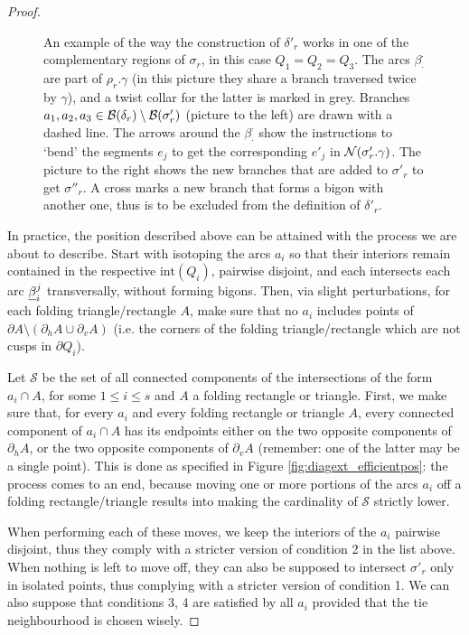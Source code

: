 \begin{proof}
\begin{figure}
\centering
\def\svgwidth{.85\textwidth}

\caption{\label{fig:diagextconstruction}An example of the way the construction of $\delta'_r$ works in one of the complementary regions of $\sigma_r$, in this case $Q_1=Q_2=Q_3$. The arcs $\beta_\cdot^\cdot$ are part of $\rho_r.\gamma$ (in this picture they share a branch traversed twice by $\gamma$), and a twist collar for the latter is marked in grey. Branches $a_1,a_2,a_3\in\mathcal B(\delta_r)\setminus\mathcal B(\sigma'_r)$ (picture to the left) are drawn with a dashed line. The arrows around the $\beta_\cdot^\cdot$ show the instructions to `bend' the segments $e_j$ to get the corresponding $e'_j$ in ${\mathcal N}(\sigma'_r.\gamma)$. The picture to the right shows the new branches that are added to $\sigma'_r$ to get $\sigma''_r$. A cross marks a new branch that forms a bigon with another one, thus is to be excluded from the definition of $\delta'_r$.}
\end{figure}

In practice, the position described above can be attained with the process we are about to describe. Start with isotoping the arcs $a_i$ so that their interiors remain contained in the respective $\mathrm{int}(Q_i)$, pairwise disjoint, and each intersects each arc $\underline{\beta}_i^j$ transversally, without forming bigons. Then, via slight perturbations, for each folding triangle/rectangle $A$, make sure that no $a_i$ includes points of $\partial A\setminus (\partial_h A\cup\partial_v A)$ (i.e. the corners of the folding triangle/rectangle which are not cusps in $\partial Q_i$).

Let $\mathcal S$ be the set of all connected components of the intersections of the form $a_i\cap A$, for some $1\leq i\leq s$ and $A$ a folding rectangle or triangle. First, we make sure that, for every $a_i$ and every folding rectangle or triangle $A$, every connected component of $a_i\cap A$ has its endpoints either on the two opposite components of $\partial_h A$, or the two opposite components of $\partial_v A$ (remember: one of the latter may be a single point). This is done as specified in Figure \ref{fig:diagext_efficientpos}: the process comes to an end, because moving one or more portions of the arcs $a_i$ off a folding rectangle/triangle results into making the cardinality of $\mathcal S$ strictly lower. 

When performing each of these moves, we keep the interiors of the $a_i$ pairwise disjoint, thus they comply with a stricter version of condition 2 in the list above. When nothing is left to move off, they can also be supposed to intersect $\sigma'_r$ only in isolated points, thus complying with a stricter version of condition 1. We can also suppose that conditions 3, 4 are satisfied by all $a_i$ provided that the tie neighbourhood is chosen wisely. 


\end{proof}
